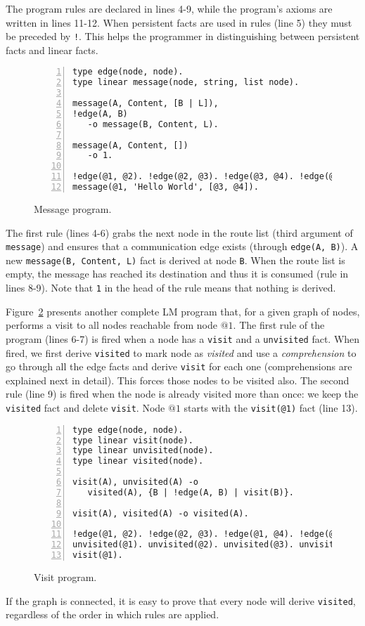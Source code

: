The program rules are declared in lines 4-9, while the program's axioms are written in lines 11-12.
When persistent facts are used in rules (line 5) they must be
preceded by \texttt{!}. This helps the programmer in distinguishing between persistent facts and linear facts.

\begin{figure}[h!]
\small\begin{Verbatim}[numbers=left]
type edge(node, node).
type linear message(node, string, list node).

message(A, Content, [B | L]),
!edge(A, B)
   -o message(B, Content, L).

message(A, Content, [])
   -o 1.

!edge(@1, @2). !edge(@2, @3). !edge(@3, @4). !edge(@1, @3).
message(@1, 'Hello World', [@3, @4]).
\end{Verbatim}
\caption{Message program.}
  \label{code:message}
\end{figure}

The first rule (lines 4-6) grabs the next node in the route list (third argument of \texttt{message}) and
ensures that a communication edge exists (through \texttt{edge(A, B)}).
A new \texttt{message(B,~Content,~L)} fact is derived at node \texttt{B}.
When the route list is empty, the message has reached its destination and thus it is consumed
(rule in lines 8-9). Note that \texttt{1} in the head of the rule means that nothing is derived.

Figure~\ref{code:visit} presents another complete LM program that, for a given graph
of nodes, performs a visit to all nodes reachable from node $@1$.
The first rule of the program (lines 6-7) is fired when a node has a \texttt{visit} and a \texttt{unvisited} fact.
When fired, we first derive \texttt{visited} to mark node as \textit{visited} and use a
\emph{comprehension} to go through all the edge facts and derive \texttt{visit} for each
one (comprehensions are explained next in detail). This forces those nodes to be visited also.
The second rule (line 9) is fired when the
node is already visited more than once: we keep the \texttt{visited} fact and delete \texttt{visit}.
Node $@1$ starts with the \texttt{visit(@1)} fact (line 13).

\begin{figure}[h!]
\small\begin{Verbatim}[numbers=left]
type edge(node, node).
type linear visit(node).
type linear unvisited(node).
type linear visited(node).

visit(A), unvisited(A) -o
   visited(A), {B | !edge(A, B) | visit(B)}.

visit(A), visited(A) -o visited(A).

!edge(@1, @2). !edge(@2, @3). !edge(@1, @4). !edge(@2, @4).
unvisited(@1). unvisited(@2). unvisited(@3). unvisited(@4).
visit(@1).
\end{Verbatim}
  \caption{Visit program.}
  \label{code:visit}
\end{figure}
\normalsize

If the graph is connected, it is easy to prove that every node will derive \texttt{visited},
regardless of the order in which rules are applied.
